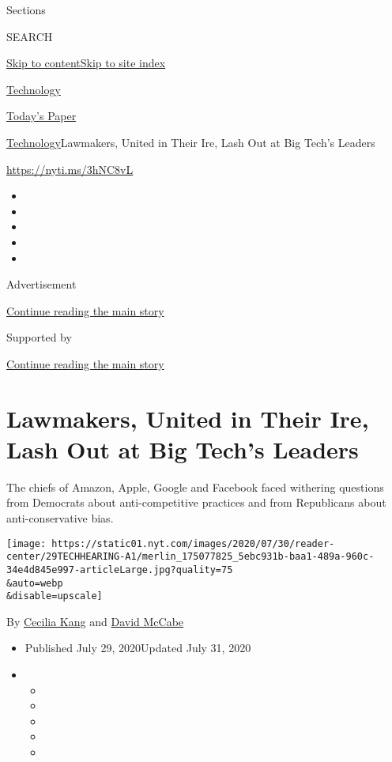 Sections

SEARCH

\protect\hyperlink{site-content}{Skip to
content}\protect\hyperlink{site-index}{Skip to site index}

\href{https://www.nytimes.com/section/technology}{Technology}

\href{https://myaccount.nytimes.com/auth/login?response_type=cookie\&client_id=vi}{}

\href{https://www.nytimes.com/section/todayspaper}{Today's Paper}

\href{/section/technology}{Technology}\textbar{}Lawmakers, United in
Their Ire, Lash Out at Big Tech's Leaders

\url{https://nyti.ms/3hNC8vL}

\begin{itemize}
\item
\item
\item
\item
\item
\end{itemize}

Advertisement

\protect\hyperlink{after-top}{Continue reading the main story}

Supported by

\protect\hyperlink{after-sponsor}{Continue reading the main story}

\hypertarget{lawmakers-united-in-their-ire-lash-out-at-big-techs-leaders}{%
\section{Lawmakers, United in Their Ire, Lash Out at Big Tech's
Leaders}\label{lawmakers-united-in-their-ire-lash-out-at-big-techs-leaders}}

The chiefs of Amazon, Apple, Google and Facebook faced withering
questions from Democrats about anti-competitive practices and from
Republicans about anti-conservative bias.

\texttt{[image: https://static01.nyt.com/images/2020/07/30/reader-center/29TECHHEARING-A1/merlin\_175077825\_5ebc931b-baa1-489a-960c-34e4d845e997-articleLarge.jpg?quality=75\\\&auto=webp\\\&disable=upscale]}

By \href{https://www.nytimes.com/by/cecilia-kang}{Cecilia Kang} and
\href{https://www.nytimes.com/by/david-mccabe}{David McCabe}

\begin{itemize}
\item
  Published July 29, 2020Updated July 31, 2020
\item
  \begin{itemize}
  \item
  \item
  \item
  \item
  \item
  \end{itemize}
\end{itemize}

